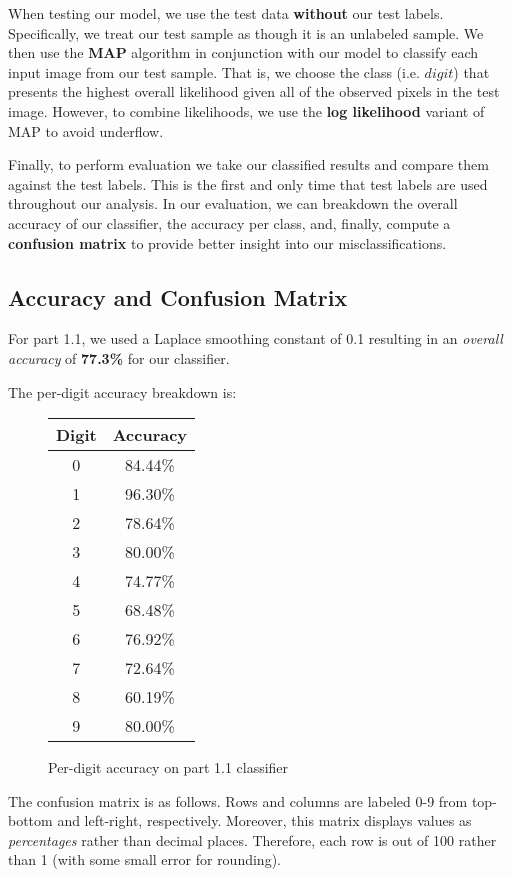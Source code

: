 \documentclass[10pt,a4paper]{article}
\begin{document}
When testing our model, we use the test data \textbf{without} our test labels. Specifically, we treat our test sample as though it is an unlabeled sample. We then use the \textbf{MAP} algorithm in conjunction with our model to classify each input image from our test sample. That is, we choose the class (i.e. $digit$) that presents the highest overall likelihood given all of the observed pixels in the test image. However, to combine likelihoods, we use the \textbf{log likelihood} variant of MAP to avoid underflow.

Finally, to perform evaluation we take our classified results and compare them against the test labels. This is the first and only time that test labels are used throughout our analysis. In our evaluation, we can breakdown the overall accuracy of our classifier, the accuracy per class, and, finally, compute a \textbf{confusion matrix} to provide better insight into our misclassifications.

\subsection{Accuracy and Confusion Matrix}
For part 1.1, we used a Laplace smoothing constant of 0.1 resulting in an \emph{overall accuracy} of \textbf{77.3\%} for our classifier.

The per-digit accuracy breakdown is:

\begin{figure}[h]
\centering
\begin{tabular}{|c|c|}
\hline
Digit & Accuracy \\
\hline
0 & 84.44\% \\
1 & 96.30\% \\
2 & 78.64\% \\
3 & 80.00\% \\
4 & 74.77\% \\
5 & 68.48\% \\
6 & 76.92\% \\
7 & 72.64\% \\
8 & 60.19\% \\
9 & 80.00\% \\
\hline
\end{tabular}
\caption{Per-digit accuracy on part 1.1 classifier}
\label{fig:digitAccuracy}
\end{figure}

The confusion matrix is as follows. Rows and columns are labeled 0-9 from top-bottom and left-right, respectively. Moreover, this matrix displays values as \emph{percentages} rather than decimal places. Therefore, each row is out of 100 rather than 1 (with some small error for rounding).
\end{document}
